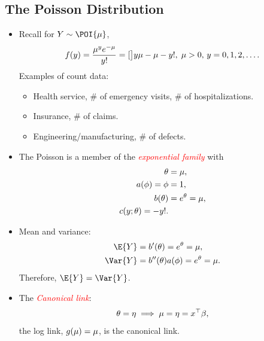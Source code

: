 \documentclass{article}\usepackage[]{graphicx}\usepackage[svgnames]{xcolor}
\let\exp\relax%
\let\log\relax%
\begin{document}
\subsection*{The Poisson Distribution}
\begin{itemize}
      \item Recall for $ Y \sim \POI{\mu} $,
            \[ f(y)=\frac{\mu^y e^{-\mu}}{y!}=\exp[\big]{y\log{\mu}-\mu-\log{y!}},\; \mu>0,\, y=0,1,2,\ldots.  \]
            Examples of count data:
            \begin{itemize}
                  \item Health service, \# of emergency visits, \# of hospitalizations.
                  \item Insurance, \# of claims.
                  \item Engineering/manufacturing, \# of defects.
            \end{itemize}
      \item The Poisson is a member of the \textcolor{Red}{\emph{exponential family}} with
            \begin{align*}
                  \theta       & =\log{\mu},      \\
                  a(\phi)=\phi & =1,              \\
                  b(\theta)    & =e^{\theta}=\mu, \\
                  c(y;\theta)=-\log{y!}.
            \end{align*}
      \item Mean and variance:
            \begin{align*}
                  \E{Y}   & =b^\prime(\theta)=e^\theta=\mu,                  \\
                  \Var{Y} & =b^{\prime\prime}(\theta)a(\phi)=e^{\theta}=\mu.
            \end{align*}
            Therefore, $ \E{Y}=\Var{Y} $.
      \item The \textcolor{Red}{\emph{Canonical link}}:
            \[ \theta=\eta\implies \log{\mu}=\eta=x^\top \beta, \]
            the log link, $ g(\mu)=\log{\mu} $, is the canonical link.
\end{itemize}
\end{document}
